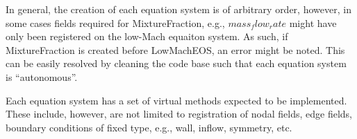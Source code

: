 In general, the creation of each equation system is of arbitrary order, however, in some cases
fields required for MixtureFraction, e.g., $mass_flow_rate$ might have only been registered
on the low-Mach equaiton system. As such, if MixtureFraction is created before LowMachEOS,
an error might be noted. This can be easily resolved by cleaning the code base such that
each equation system is ``autonomous''.

Each equation system has a set of virtual methods expected to be implemented. These include, however,
are not limited to registration of nodal fields, edge fields, boundary conditions of fixed
type, e.g., wall, inflow, symmetry, etc.

